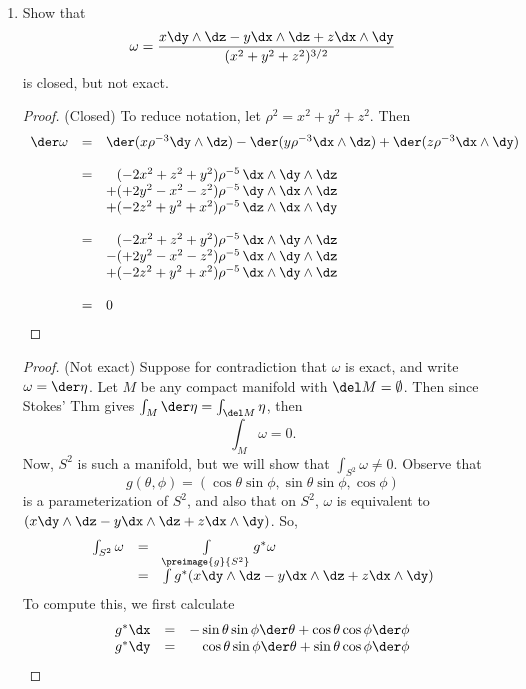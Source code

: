 \documentclass[letterpaper]{article}
\begin{document}
\begin{enumerate}
	\item Show that 
	$$\omega = \frac{x\dy\wedge\dz-y\dx\wedge\dz+z\dx\wedge\dy}{(x^2+y^2+z^2)^{3/2}}$$
	is closed, but not exact. 
	\begin{proof}
		(Closed) To reduce notation, let $\rho^2=x^2+y^2+z^2$. Then 
		\[\begin{array}{rcl}
			\der\omega&=&\der({x}{\rho	^{-3}}\dy\wedge\dz)-\der({y}{\rho	^{-3}}\dx\wedge\dz)+\der({z}{\rho	^{-3}}\dx\wedge\dy)\\
\\			&=&\phantom{+}(-2x^2+z^2+y^2)\rho^{-5} \,\dx\wedge\dy\wedge\dz\\
			&&{+}(+2y^2-x^2-z^2)\rho^{-5} \,\dy\wedge\dx\wedge\dz\\
			&&{+}(-2z^2+y^2+x^2)\rho^{-5} \,\dz\wedge\dx\wedge\dy\\
			\\
			&=&\phantom{+}(-2x^2+z^2+y^2)\rho^{-5} \,\dx\wedge\dy\wedge\dz\\
			&&{-}(+2y^2-x^2-z^2)\rho^{-5} \,\dx\wedge\dy\wedge\dz\\
			&&{+}(-2z^2+y^2+x^2)\rho^{-5} \,\dx\wedge\dy\wedge\dz\\
\\			&=&0
		\end{array}\]
	\end{proof}
	\begin{proof}
		(Not exact) Suppose for contradiction that $\omega$ is exact, and write $\omega=\der\eta$. Let $M$ be any compact manifold with $\del M=\emptyset$. Then since Stokes' Thm gives $\int_M\der\eta=\int_{\del M}\eta$, then 
		\[
			\int_M\omega=0.
		\]
		Now, $S^2$ is such a manifold, but we will show that $\int_{S^2}\omega\neq0$. Observe that 
		$$g(\theta, \phi)=(\cos\theta\sin\phi, \sin\theta\sin\phi, \cos\phi)$$ is a parameterization of $S^2$, and also that on $S^2$, $\omega$ is equivalent to $(x\dy\wedge\dz-y\dx\wedge\dz+z\dx\wedge\dy)$. So, 
		\[\begin{array}{rcl}
		  \int_{S^2}\omega &=& \int\limits_{\preimage{g}{S^2}}g^*\omega\\
		  &=& \int g^*(x\dy\wedge\dz-y\dx\wedge\dz+z\dx\wedge\dy)
		\end{array}\]
		To compute this, we first calculate
		\[\begin{array}{rcl}
			g^*{\dx}&=&-\sin\theta\sin\phi\der\theta+\cos\theta\cos\phi\der\phi\\
			g^*{\dy}&=&\phantom{-}\cos\theta\sin\phi\der\theta+\sin\theta\cos\phi\der\phi\\

\end{array}\]
\end{proof}
\end{enumerate}
\end{document}
